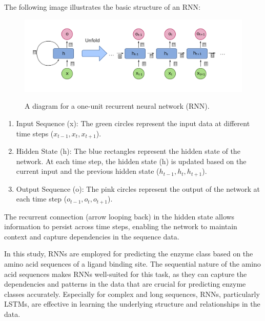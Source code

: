The following image illustrates the basic structure of an RNN:

\begin{figure}[hbt]
    \centering
    \begin{minipage}[t]{\textwidth}
    \caption{A diagram for a one-unit recurrent neural network (RNN).}
    \includegraphics[width=1\textwidth]{img/Recurrent Neural Network Unfold.png}\\
    \label{fig:RNN}
    \end{minipage}
\end{figure}

\begin{enumerate}
    \item Input Sequence (x): The green circles represent the input data at different time steps ($ x_{t-1}, x_{t}, x_{t+1} $).
    \item Hidden State (h): The blue rectangles represent the hidden state of the network. At each time step, the hidden state (h) is updated based on the current input and the previous hidden state ($h_{t-1}, h_{t}, h_{t+1}$).
    \item Output Sequence (o): The pink circles represent the output of the network at each time step ($o_{t-1}, o_{t}, o_{t+1}$).
\end{enumerate}

The recurrent connection (arrow looping back) in the hidden state allows information to persist across time steps, enabling the network to maintain context and capture dependencies in the sequence data.

In this study, RNNs are employed for predicting the enzyme class based on the amino acid sequences of a ligand binding site. The sequential nature of the amino acid sequences makes RNNs well-suited for this task, as they can capture the dependencies and patterns in the data that are crucial for predicting enzyme classes accurately. Especially for complex and long sequences, RNNs, particularly LSTMs, are effective in learning the underlying structure and relationships in the data.

